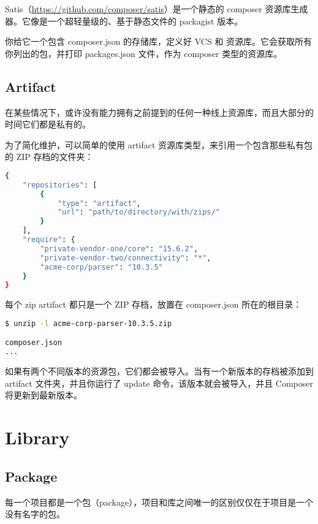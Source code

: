 Satis（\url{https://github.com/composer/satis}）是一个静态的 composer 资源库生成器。它像是一个超轻量级的、基于静态文件的 packagist 版本。

你给它一个包含 composer.json 的存储库，定义好 VCS 和 资源库。它会获取所有你列出的包，并打印 packages.json 文件，作为 composer 类型的资源库。



\subsection{Artifact}

在某些情况下，或许没有能力拥有之前提到的任何一种线上资源库，而且大部分的时间它们都是私有的。

为了简化维护，可以简单的使用 artifact 资源库类型，来引用一个包含那些私有包的 ZIP 存档的文件夹：

\begin{lstlisting}[language=bash]
{
    "repositories": [
        {
            "type": "artifact",
            "url": "path/to/directory/with/zips/"
        }
    ],
    "require": {
        "private-vendor-one/core": "15.6.2",
        "private-vendor-two/connectivity": "*",
        "acme-corp/parser": "10.3.5"
    }
}
\end{lstlisting}

每个 zip artifact 都只是一个 ZIP 存档，放置在 composer.json 所在的根目录：


\begin{lstlisting}[language=bash]
$ unzip -l acme-corp-parser-10.3.5.zip

composer.json
...
\end{lstlisting}

如果有两个不同版本的资源包，它们都会被导入。当有一个新版本的存档被添加到 artifact 文件夹，并且你运行了 update 命令，该版本就会被导入，并且 Composer 将更新到最新版本。






\section{Library}


\subsection{Package}


每一个项目都是一个包（package），项目和库之间唯一的区别仅仅在于项目是一个没有名字的包。



